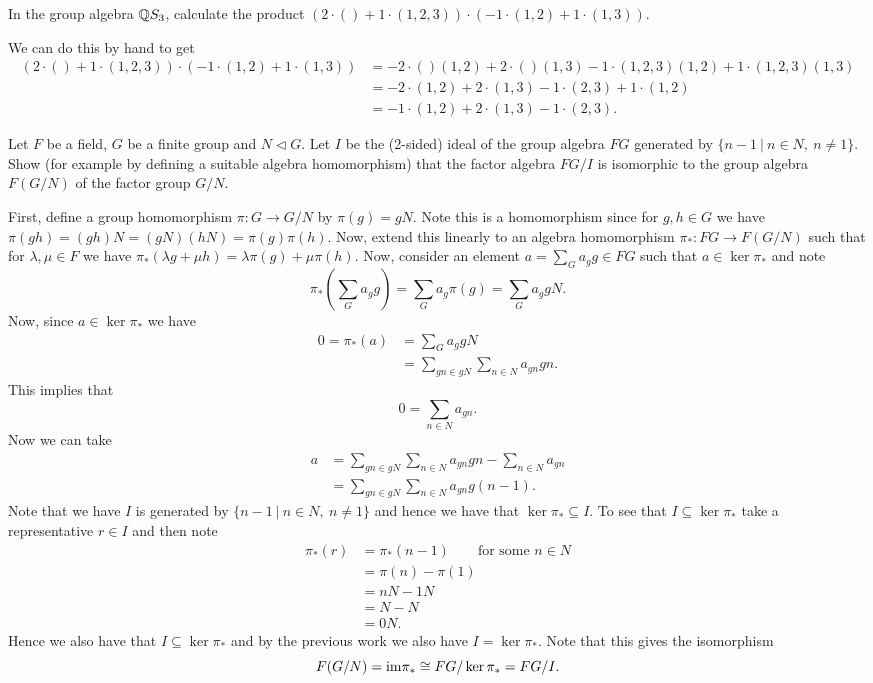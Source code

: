 \documentclass[leqno]{article}
\begin{document}
\newpage
\begin{problem}
In the group algebra $\mathbb{Q} S_3$, calculate the product $(2\cdot ()+1\cdot(1,2,3))\cdot(-1\cdot(1,2)+1\cdot(1,3))$.
\end{problem}
\begin{solution}
We can do this by hand to get
\begin{align*}
    (2\cdot ()+ 1\cdot (1,2,3))\cdot (-1\cdot (1,2)+1\cdot (1,3))&=-2\cdot ()(1,2)+2\cdot ()(1,3)-1\cdot (1,2,3)(1,2)+1\cdot (1,2,3)(1,3)\\
    &= -2\cdot (1,2) + 2 \cdot (1,3) - 1\cdot (2,3) + 1 \cdot (1,2)\\
    &= -1\cdot (1,2)+2\cdot (1,3)-1\cdot (2,3).
\end{align*}
\end{solution}

\newpage
\begin{problem}
Let $F$ be a field, $G$ be a finite group and $N\triangleleft G$. Let $I$ be the (2-sided) ideal of the group algebra $FG$ generated by $\{n-1~\vert~ n\in N, ~ n\neq1\}$. Show (for example by defining a suitable algebra homomorphism) that the factor algebra $FG/I$ is isomorphic to the group algebra $F(G/N)$ of the factor group $G/N$.  
\end{problem}
\begin{solution}
First, define a group homomorphism $\pi \colon G \to G/N$ by $\pi(g)=gN$. Note this is a homomorphism since for $g,h\in G$ we have $\pi(gh)=(gh)N=(gN)(hN)=\pi(g)\pi(h)$.  Now, extend this linearly to an algebra homomorphism $\pi_* \colon FG \to F(G/N)$ such that for $\lambda,\mu \in F$ we have $\pi_*(\lambda g + \mu h)= \lambda \pi(g)+\mu \pi(h)$.  Now, consider an element $a=\sum_{G} a_g g \in FG$ such that $a\in \ker \pi_*$ and note
\[
\pi_* \left(\sum_{G} a_g g\right) = \sum_G a_g \pi(g) = \sum_G a_g gN.
\]
Now, since $a\in \ker \pi_*$ we have
\begin{align*}
    0=\pi_*(a) &= \sum_G a_g gN\\
    &= \sum_{gn\in gN} \sum_{n\in N} a_{gn}gn.
\end{align*}
This implies that
\[
0 = \sum_{n\in N}a_{gn}.
\]
Now we can take
\begin{align*}
a &= \sum_{gn\in gN}\sum_{n\in N} a_{gn}gn - \sum_{n\in N}a_{gn}\\
&= \sum_{gn \in gN}\sum_{n\in N} a_{gn}g(n-1).
\end{align*}
Note that we have $I$ is generated by $\{n-1 ~\vert~ n\in N, ~ n\neq 1\}$ and hence we have that $\ker \pi_*\subseteq I$. To see that $I\subseteq \ker \pi_*$ take a representative $r\in I$ and then note
\begin{align*}
    \pi_* (r) &= \pi_*(n-1) \qquad \textrm{for some $n \in N$}\\
    &= \pi(n)-\pi(1)\\
    &= nN-1N\\
    &=N-N\\
    &=0N.
\end{align*}
Hence we also have that $I\subseteq \ker \pi_*$ and by the previous work we also have $I=\ker \pi_*$.  Note that this gives the isomorphism 
\[
F(G/N)=\mathrm{im} \pi_* \cong FG/\ker \pi_* = FG/I.
\]
\end{solution}
\end{document}
